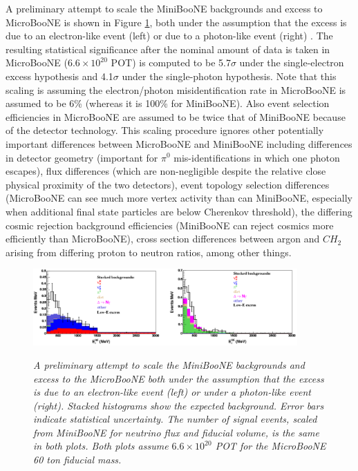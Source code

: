 A preliminary attempt to scale the MiniBooNE backgrounds and excess to MicroBooNE is shown in Figure \ref{TDR_LEE_scaling_fig}, both under the assumption that the excess is due to an electron-like event (left) or due to a photon-like event (right) \cite{UBTDR}. The resulting statistical significance after the nominal amount of data is taken in MicroBooNE ($6.6\times 10^20$ POT) is computed to be 5.7$\sigma$ under the single-electron excess hypothesis and 4.1$\sigma$ under the single-photon hypothesis. Note that this scaling is assuming the electron/photon misidentification rate in MicroBooNE is assumed to be 6\% (whereas it is 100\% for MiniBooNE). Also event selection efficiencies in MicroBooNE are assumed to be twice that of MiniBooNE because of the detector technology. This scaling procedure ignores other potentially important differences between MicroBooNE and MiniBooNE including differences in detector geometry (important for $\pi^0$ mis-identifications in which one photon escapes), flux differences (which are non-negligible despite the relative close physical proximity of the two detectors), event topology selection differences (MicroBooNE can see much more vertex activity than can MiniBooNE, especially when additional final state particles are below Cherenkov threshold), the differing cosmic rejection background efficiencies (MiniBooNE can reject cosmics more efficiently than MicroBooNE), cross section differences between argon and $CH_2$ arising from differing proton to neutron ratios, among other things.\\

\begin{figure}[ht!]
\centering
	\includegraphics[width=0.9\textwidth]{Figures/TDR_LEE_scaling.png} \\
\caption{\textit{A preliminary attempt to scale the MiniBooNE backgrounds and excess to the MicroBooNE both under the assumption that the excess is due to an electron-like event (left) or under a photon-like event (right). Stacked histograms show the expected background. Error bars indicate statistical uncertainty. The number of signal events, scaled from MiniBooNE for neutrino flux and fiducial volume, is the same in both plots. Both plots assume $6.6 \times 10^20$ POT for the MicroBooNE 60 ton fiducial mass.}}\label{TDR_LEE_scaling_fig}
\end{figure}

